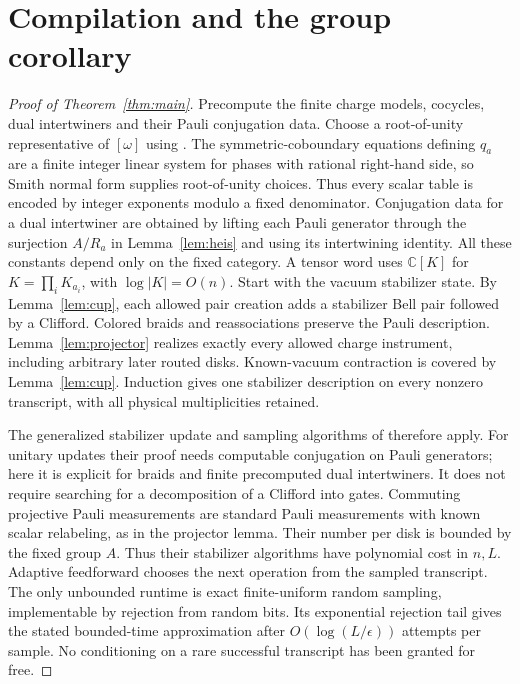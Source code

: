 \documentclass[11pt]{amsart}
\theoremstyle{definition}\newtheorem{definition}[theorem]{Definition}
\newcommand{\C}{\mathbb C}
\begin{document}
\section{Compilation and the group corollary}
\begin{proof}[Proof of Theorem~\ref{thm:main}]
Precompute the finite charge models, cocycles, dual intertwiners and their
Pauli conjugation data. Choose a root-of-unity representative of $[\omega]$
using \cite[Lemma 4.3]{ERW}. The symmetric-coboundary equations defining
$q_a$ are a finite integer linear system for phases with rational right-hand
side, so Smith normal form supplies root-of-unity choices. Thus every scalar
table is encoded by integer exponents modulo a fixed denominator. Conjugation
data for a dual intertwiner are obtained by lifting each Pauli generator through
the surjection $A/R_a$ in Lemma~\ref{lem:heis} and using its intertwining identity.
All these constants depend only on the fixed category.
A tensor word uses $\C[K]$ for $K=\prod_i K_{a_i}$, with
$\log|K|=O(n)$. Start with the vacuum stabilizer state. By Lemma~\ref{lem:cup},
each allowed pair creation adds a stabilizer Bell pair followed by a Clifford.
Colored braids and reassociations preserve the Pauli description.
Lemma~\ref{lem:projector} realizes exactly every allowed charge instrument,
including arbitrary later routed disks. Known-vacuum contraction is covered
by Lemma~\ref{lem:cup}. Induction gives one stabilizer description on every
nonzero transcript, with all physical multiplicities retained.

The generalized stabilizer update and sampling algorithms of \cite{BV}
therefore apply. For unitary updates their proof needs computable conjugation
on Pauli generators; here it is explicit for braids and finite precomputed
dual intertwiners. It does not require searching for a decomposition of a
Clifford into gates. Commuting projective Pauli measurements are standard
Pauli measurements with known scalar relabeling, as in the projector lemma.
Their number per disk is bounded by the fixed group $A$.
Thus their stabilizer algorithms have polynomial cost in $n,L$.
Adaptive feedforward chooses the next operation from the sampled transcript.
The only unbounded runtime is exact finite-uniform random sampling, implementable
by rejection from random bits. Its exponential rejection tail gives the stated
bounded-time approximation after $O(\log(L/\epsilon))$ attempts per sample.
No conditioning on a rare successful transcript has been granted for free.
\end{proof}
\end{document}
